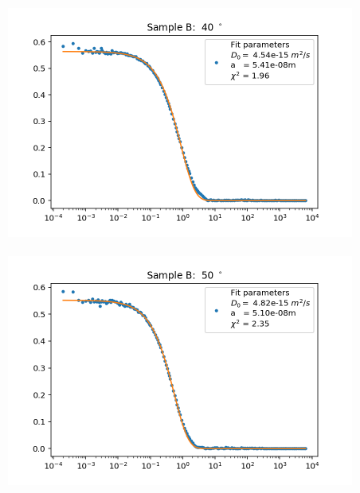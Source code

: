 \documentclass[]{article}
\begin{document}
\begin{figure}[!h]
\medskip
\begin{subfigure}{0.48\textwidth}
\includegraphics[width=\linewidth]{Plots/B/40.png}
\end{subfigure}
\begin{subfigure}[c]{0.48\linewidth}
\includegraphics[width=\linewidth]{Plots/B/50.png}
\end{subfigure}


\end{figure}
\end{document}
